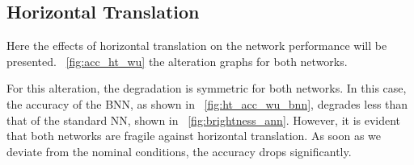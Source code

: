 \subsection{Horizontal Translation}

Here the effects of horizontal translation on the network performance will be presented. \Fig~\ref{fig:acc_ht_wu} the alteration graphs for both networks.

For this alteration, the degradation is symmetric for both networks. In this case, the accuracy of the BNN, as shown in \Fig~\ref{fig:ht_acc_wu_bnn}, degrades less than that of the standard NN, shown in \Fig~\ref{fig:brightness_ann}. However, it is evident that both networks are fragile against horizontal translation. As soon as we deviate from the nominal conditions, the accuracy drops significantly.

